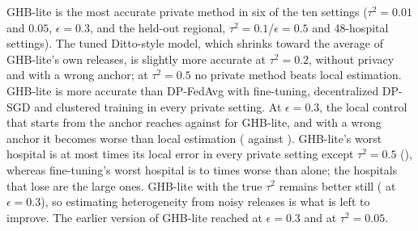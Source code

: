 \documentclass[acmsmall,screen,nonacm]{acmart}
\theoremstyle{acmdefinition}
\begin{document}
GHB-lite is the most accurate private method in six of the ten settings ($\tau^2=0.01$ and $0.05$, $\epsilon=0.3$, and the held-out regional, $\tau^2=0.1$/$\epsilon=0.5$ and 48-hospital settings). The tuned Ditto-style \cite{li2021ditto} model, which shrinks toward the average of GHB-lite's own releases, is slightly more accurate at $\tau^2=0.2$, without privacy and with a wrong anchor; at $\tau^2=0.5$ no private method beats local estimation. GHB-lite is more accurate than DP-FedAvg \cite{mcmahan2018learning} with fine-tuning, decentralized DP-SGD \cite{lian2017can} and clustered training \cite{ghosh2020efficient} in every private setting. At $\epsilon=0.3$, the local control that starts from the anchor reaches \SimFifteenStrictAnchorGD{} against \SimFifteenStrictGHB{} for GHB-lite, and with a wrong anchor it becomes worse than local estimation (\SimFifteenAnchorAnchorGD{} against \SimFifteenAnchorLocal). GHB-lite's worst hospital is at most \SimFifteenGHBWorstMax{} times its local error in every private setting except $\tau^2=0.5$ (\SimFifteenExtremeGHBWorst), whereas fine-tuning's worst hospital is \SimFifteenFTWorstMin{} to \SimFifteenFTWorstMax{} times worse than alone; the hospitals that lose are the large ones. GHB-lite with the true $\tau^2$ remains better still (\SimFifteenStrictOracle{} at $\epsilon=0.3$), so estimating heterogeneity from noisy releases is what is left to improve. The earlier version of GHB-lite reached \SimFifteenStrictOld{} at $\epsilon=0.3$ and \SimFifteenMidOld{} at $\tau^2=0.05$.
\end{document}

